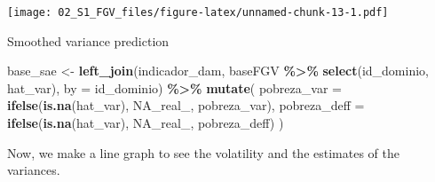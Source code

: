 \documentclass[
  12pt,
]{book}
\newenvironment{Shaded}{\begin{snugshade}}{\end{snugshade}}
\newcommand{\AttributeTok}[1]{\textcolor[rgb]{0.13,0.29,0.53}{#1}}
\newcommand{\ConstantTok}[1]{\textcolor[rgb]{0.56,0.35,0.01}{#1}}
\newcommand{\FunctionTok}[1]{\textcolor[rgb]{0.13,0.29,0.53}{\textbf{#1}}}
\newcommand{\NormalTok}[1]{#1}
\newcommand{\OtherTok}[1]{\textcolor[rgb]{0.56,0.35,0.01}{#1}}
\newcommand{\SpecialCharTok}[1]{\textcolor[rgb]{0.81,0.36,0.00}{\textbf{#1}}}
\begin{document}
\texttt{[image: 02\_S1\_FGV\_files/figure-latex/unnamed-chunk-13-1.pdf]}

Smoothed variance prediction

\begin{Shaded}
\begin{Highlighting}[]
\NormalTok{base\_sae }\OtherTok{\textless{}{-}} \FunctionTok{left\_join}\NormalTok{(indicador\_dam,}
\NormalTok{                      baseFGV }\SpecialCharTok{\%\textgreater{}\%} \FunctionTok{select}\NormalTok{(id\_dominio, hat\_var),}
                      \AttributeTok{by =}\NormalTok{ id\_dominio) }\SpecialCharTok{\%\textgreater{}\%}
  \FunctionTok{mutate}\NormalTok{(}
    \AttributeTok{pobreza\_var =} \FunctionTok{ifelse}\NormalTok{(}\FunctionTok{is.na}\NormalTok{(hat\_var), }\ConstantTok{NA\_real\_}\NormalTok{, pobreza\_var),}
    \AttributeTok{pobreza\_deff =} \FunctionTok{ifelse}\NormalTok{(}\FunctionTok{is.na}\NormalTok{(hat\_var), }\ConstantTok{NA\_real\_}\NormalTok{, pobreza\_deff)}
\NormalTok{  )}
\end{Highlighting}
\end{Shaded}

Now, we make a line graph to see the volatility and the estimates of the variances.
\end{document}
